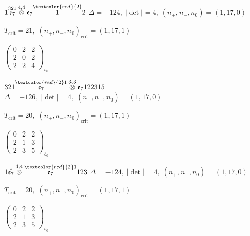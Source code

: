 \documentclass[10pt]{article}
\begin{document}
$1\overset{321}{\mathfrak{e}_7}\overset{4,4}{\otimes}\mathfrak{e}_7\overset{\textcolor{red}{2}}{1}2$ \quad $\Delta=-124,\; |\det|=4,\; (n_+,n_-,n_0)=(1,17,0)$

\hspace{1em}$T_{\text{crit}}=21,\; (n_+,n_-,n_0)_{\text{crit}}=(1,17,1)$

\hspace{2em}$\left(\begin{smallmatrix}0 & 2 & 2 \\ 2 & 0 & 2 \\ 2 & 2 & 4\end{smallmatrix}\right)_{\!b_0}$

\smallskip

$321\overset{\textcolor{red}{2}1}{\mathfrak{e}_7}\overset{3,3}{\otimes}\mathfrak{e}_7122315$ \quad $\Delta=-126,\; |\det|=4,\; (n_+,n_-,n_0)=(1,17,0)$

\hspace{1em}$T_{\text{crit}}=20,\; (n_+,n_-,n_0)_{\text{crit}}=(1,17,1)$

\hspace{2em}$\left(\begin{smallmatrix}0 & 2 & 2 \\ 2 & 1 & 3 \\ 2 & 3 & 5\end{smallmatrix}\right)_{\!b_0}$

\smallskip

$1\overset{1}{\mathfrak{e}_7}\overset{4,4}{\otimes}\overset{\textcolor{red}{2}1}{\mathfrak{e}_7}123$ \quad $\Delta=-124,\; |\det|=4,\; (n_+,n_-,n_0)=(1,17,0)$

\hspace{1em}$T_{\text{crit}}=20,\; (n_+,n_-,n_0)_{\text{crit}}=(1,17,1)$

\hspace{2em}$\left(\begin{smallmatrix}0 & 2 & 2 \\ 2 & 1 & 3 \\ 2 & 3 & 5\end{smallmatrix}\right)_{\!b_0}$

\smallskip
\end{document}

